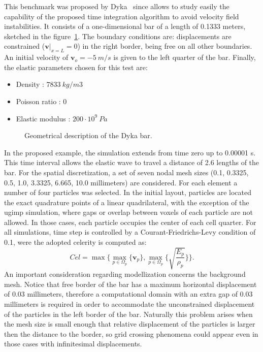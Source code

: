 \documentclass[preprint,12pt,a4paper]{elsarticle}
\newcommand{\vect}[1]{
  \ensuremath{\mathbf{{#1}}}
}
\begin{document}
This benchmark was proposed by Dyka~\cite{Dyka1995} since allows to study easily the capability
of the proposed time integration algorithm to avoid velocity
field instabilities. It consists of a one-dimensional bar of a length
of 0.1333 meters, sketched in the figure~\ref{fig:Dyka_Bar}. The
boundary conditions are: displacements are constrained ($\vect{v}
\rvert_{x=L} = 0$) in the right border, being free on all other boundaries. An initial velocity of $\vect{v}_o = - 5\ m/s$ is given to the
left quarter of the bar. Finally, the elastic parameters chosen for this test are:
\begin{itemize} 
\item  Density : $7833\ kg/m3$
\item  Poisson ratio : $0$
\item  Elastic modulus : $200 \cdot 10^9\ Pa$
\end{itemize}
\begin{figure}\sidecaption
  \centering
  \resizebox{\hsize}{!}{
    }
  \caption{Geometrical description of the Dyka \cite{Dyka1995} bar.}
  \label{fig:Dyka_Bar}
\end{figure}
In the proposed example, the simulation extends from time zero up to 0.00001 s.
This time interval allows the elastic wave to travel a distance of 2.6
lengths of the bar. For the spatial
discretization, a set of seven nodal mesh sizes (0.1, 0.3325, 0.5,
1.0, 3.3325, 6.665, 10.0 millimeters) are considered. For each element a number of
four particles was selected. In the initial layout, particles are located the exact quadrature points of a linear quadrilateral, with
the exception of the \acrshort{ugimp} simulation, where gaps or overlap between
voxels of each particle are not allowed. In those cases, each particle
occupies the center of each cell quarter. For all simulations, time step
is controlled by a Courant-Friedrichs-Levy condition of 0.1, were the adopted
celerity is computed as:
\begin{equation}
  \label{eq:Cel}
  Cel = \max\{\max_{p \in \Omega_p}\{ \vect{v}_p \} , \max_{p \in \Omega_p}\{ \sqrt{\frac{E_p}{\rho_p}} \} \}.
\end{equation}
An important consideration regarding modellization concerns the
background mesh. Notice that free border of the bar has a maximum
horizontal displacement of 0.03 millimeters, therefore 
a computational domain with an extra gap of 0.03 millimeters is
required in order to accommodate the unconstrained displacement of the
particles in the left border of the bar. Naturally this problem arises
when the mesh size is small enough that relative displacement of the
particles is larger then the distance to the border, so grid crossing
phenomena could appear even in those cases with infinitesimal
displacements.
\end{document}
